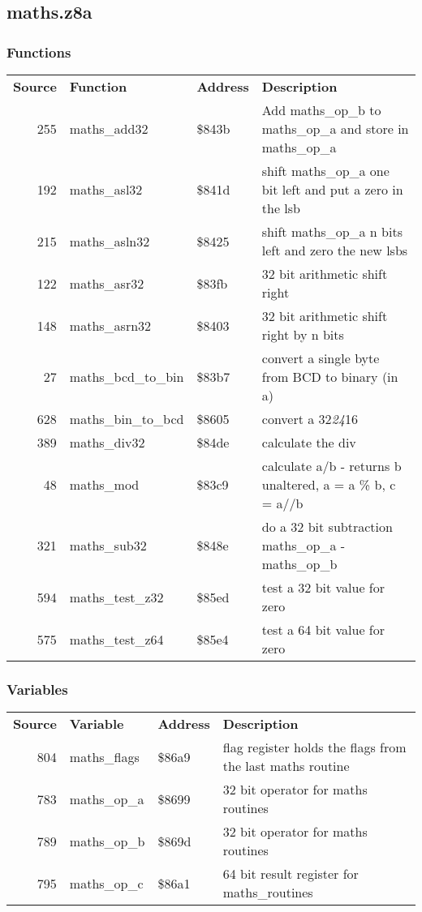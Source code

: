 \subsection{maths.z8a}
\subsubsection{Functions}
\begin{tabular}{rllp{7cm}}
 \textbf{Source}&\textbf{Function}&\textbf{Address}&\textbf{Description}\\
 255&maths\_add32&\$843b&Add maths\_op\_b to maths\_op\_a and store in maths\_op\_a\\
 192&maths\_asl32&\$841d&shift maths\_op\_a one bit left and put a zero in the lsb\\
 215&maths\_asln32&\$8425&shift maths\_op\_a n bits left and zero the new lsbs\\
 122&maths\_asr32&\$83fb&32 bit arithmetic shift right\\
 148&maths\_asrn32&\$8403&32 bit arithmetic shift right by n bits\\
 27&maths\_bcd\_to\_bin&\$83b7&convert a single byte from BCD to binary (in a)\\
 628&maths\_bin\_to\_bcd&\$8605&convert a 32\textit{24}16\\
 389&maths\_div32&\$84de&calculate the div\\
 48&maths\_mod&\$83c9&calculate a/b - returns b unaltered, a = a \% b, c = a//b\\
 321&maths\_sub32&\$848e&do a 32 bit subtraction maths\_op\_a - maths\_op\_b\\
 594&maths\_test\_z32&\$85ed&test a 32 bit value for zero\\
 575&maths\_test\_z64&\$85e4&test a 64 bit value for zero\\
\end{tabular}

\subsubsection{Variables}
\begin{tabular}{rllp{7cm}}
 \textbf{Source}&\textbf{Variable}&\textbf{Address}&\textbf{Description}\\
 804&maths\_flags&\$86a9&flag register holds the flags from the last maths routine\\
 783&maths\_op\_a&\$8699&32 bit operator for maths routines\\
 789&maths\_op\_b&\$869d&32 bit operator for maths routines\\
 795&maths\_op\_c&\$86a1&64 bit result register for maths\_routines\\
\end{tabular}

